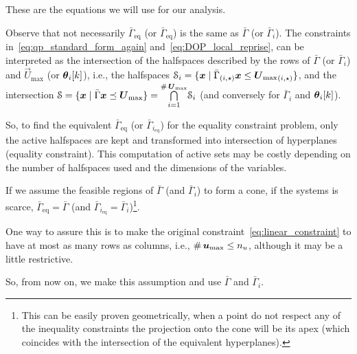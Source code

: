 \documentclass[../main.tex]{subfiles}
\begin{document}
These are the equations we will use for our analysis.

\begin{remark}
  Observe that not necessarily $\bar{\Gamma}_{\text{eq}}$ (or $\bar{\Gamma}_{\text{eq}}$) is the same as $\bar{\Gamma}$ (or $\bar{\Gamma}_{i}$).
  The constraints in~\eqref{eq:qp_standard_form_again} and~\eqref{eq:DOP_local_reprise}, can be interpreted as the intersection of the halfspaces described by the rows of $\bar{\Gamma}$ (or $\bar{\Gamma}_{i}$) and $\vec{U}_{\max}$ (or $\thetaik$), i.e., the halfspaces
  ${\set{S}_i=\setbuild{\vec{x}}{\elem[i,\star]{{\bar{\Gamma}}}\vec{x}\leq\elem[i,\star]{\vec{U}_{\max}}}}$, and the intersection ${\set{S}=\setbuild{\vec{x}}{\bar{\Gamma}\vec{x}\preceq\vec{U}_{\max}}=\bigcap\limits_{i=1}^{\card\vec{U}_{\max}}}\set{S}_{i}$ (and conversely for $\bar{\Gamma}_{i}$ and $\thetaik$).

  So, to find the equivalent $\bar{\Gamma}_{\text{eq}}$ (or $\bar{\Gamma}_{i_{\text{eq}}}$) for the equality constraint problem, only the active halfspaces are kept and transformed into intersection of hyperplanes (equality constraint).
  This computation of active sets may be costly depending on the number of halfspaces used and the dimensions of the variables.

  If we assume the feasible regions of $\bar{\Gamma}$ (and $\bar{\Gamma}_{i}$) to form a cone, if the systems is scarce, $\bar{\Gamma}_{\text{eq}}=\bar{\Gamma}$ (and $\bar{\Gamma}_{i_\text{eq}}=\bar{\Gamma}_i$)\footnote{This can be easily proven geometrically, when a point do not respect any of the inequality constraints the projection onto the cone will be its apex (which coincides with the intersection of the equivalent hyperplanes).}.

One way to assure this is to make the original constraint~\eqref{eq:linear_constraint} to have at most as many rows as columns, i.e., $\card{\vec{u}_{\max}}\leq n_{u}$, although it may be a little restrictive.

So, from now on, we make this assumption and use $\bar{\Gamma}$ and $\bar{\Gamma}_{i}$.

\end{remark}
\end{document}
